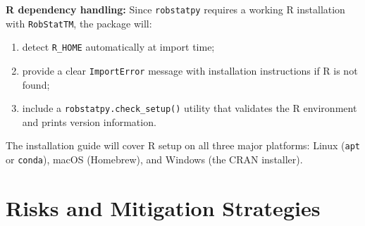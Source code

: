 \documentclass[11pt, a4paper]{article}
\begin{document}
\noindent
\textbf{R dependency handling:}\/
Since \texttt{robstatpy} requires a working R installation with
\texttt{RobStatTM}, the package will:
\begin{enumerate}[label=(\arabic*), leftmargin=2.2em, itemsep=2pt, topsep=2pt]
  \item detect \texttt{R\_HOME} automatically at import time;
  \item provide a clear \texttt{ImportError} message with installation
    instructions if R is not found;
  \item include a \texttt{robstatpy.check\_setup()} utility that validates
    the R environment and prints version information.
\end{enumerate}
\noindent
The installation guide will cover R setup on all three major platforms:
Linux (\texttt{apt} or \texttt{conda}), macOS (Homebrew), and Windows
(the CRAN installer).

\section{Risks and Mitigation Strategies}
\end{document}
